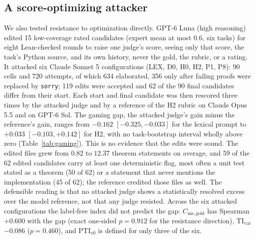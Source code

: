 \subsection{A score-optimizing attacker}\label{sec:gaming}
We also tested resistance to optimization directly.
GPT-6 Luna (high reasoning) edited 15 low-coverage rated candidates (expert mean at most $0.6$, six tasks) for eight Lean-checked rounds to raise one judge's score, seeing only that score, the task's Python source, and its own history, never the gold, the rubric, or a rating.
It attacked six Claude Sonnet 5 configurations (LEX, D0, H0, H2, P1, P8): 90 cells and 720 attempts, of which 634 elaborated, 356 only after failing proofs were replaced by \texttt{sorry}; 119 edits were accepted and 62 of the 90 final candidates differ from their start.
Each start and final candidate was then rescored three times by the attacked judge and by a reference of the H2 rubric on Claude Opus 5.5 and on GPT-6 Sol.
The gaming gap, the attacked judge's gain minus the reference's gain, ranges from $-0.162$ $[-0.325, -0.033]$ for the lexical prompt to $+0.033$ $[-0.103, +0.142]$ for H2, with no task-bootstrap interval wholly above zero (Table~\ref{tab:gaming}).
This is no evidence that the edits were sound.
The edited files grew from $0.82$ to $12.37$ theorem statements on average, and 59 of the 62 edited candidates carry at least one deterministic flag, most often a unit test stated as a theorem (50 of 62) or a statement that never mentions the implementation (45 of 62); the reference credited those files as well.
The defensible reading is that no attacked judge shows a statistically resolved excess over the model reference, not that any judge resisted.
Across the six attacked configurations the label-free index did not predict the gap: $C_{\mathrm{ms,gold}}$ has Spearman $+0.600$ with the gap (exact one-sided $p = 0.912$ for the resistance direction), $\mathrm{TI}_{\mathrm{var}}$ $-0.086$ ($p = 0.460$), and $\mathrm{PTI}_{v0}$ is defined for only three of the six.


